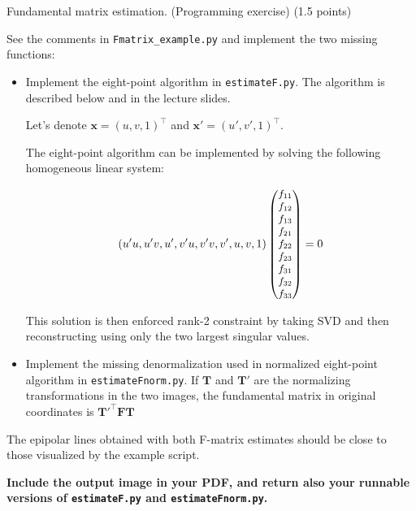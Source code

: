 \documentclass[12pt]{article} %
\newenvironment{exercise}[2][Task]{\begin{trivlist}
\item[\hskip \labelsep {\bfseries #1}\hskip \labelsep {\bfseries #2.}]}{\end{trivlist}}
\begin{document}
\begin{exercise}{2} Fundamental matrix estimation. (Programming exercise) (1.5 points)
	
	\vspace{1mm}
	\noindent See the comments in \texttt{Fmatrix\_example.py} and implement the two missing functions:
	\begin{itemize}
		\item[\textit{a)}] Implement the eight-point algorithm in \texttt{estimateF.py}. The algorithm is described below and in the lecture slides.
		\vspace{1mm}
		
		Let's denote $\mathbf{x}=(u,v,1)^\top$ and $\mathbf{x}'=(u',v',1)^\top$.
		
		The eight-point algorithm can be implemented by solving the following homogeneous linear system:
		
		\begin{equation*}
		\small		
		(u'u, u'v, u', v'u, v'v, v',u, v, 1)
		\begin{pmatrix} f_{11} \\ f_{12} \\f_{13} \\f_{21} \\f_{22} \\f_{23} \\f_{31} \\f_{32} \\f_{33} \\ \end{pmatrix} = 0
		\end{equation*}
		
		This solution is then enforced rank-2 constraint by taking SVD and then reconstructing using only the two largest singular values.
		
		\item[\textit{b)}] Implement the missing denormalization used in normalized eight-point algorithm in \texttt{estimateFnorm.py}. If $\mathbf{T}$ and $\mathbf{T}'$ are the normalizing transformations in the
		two images, the fundamental matrix in original
		coordinates is $\mathbf{T}'^\top\mathbf{F}\mathbf{T}$
	\end{itemize}
	
	\noindent The epipolar lines obtained with both F-matrix estimates should be close to those visualized by the example script. 

 \noindent \textbf{Include the output image in your PDF, and return also your runnable versions
of \texttt{estimateF.py} and \texttt{estimateFnorm.py}.}
\end{exercise}
\end{document}
